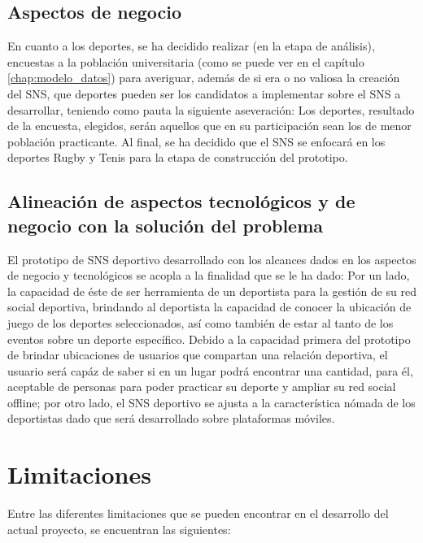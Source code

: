 \subsection{Aspectos de negocio}

En cuanto a los deportes, se ha decidido realizar (en la etapa de análisis), encuestas a la población universitaria (como se puede ver en el capítulo \ref{chap:modelo_datos}) para averiguar, además de si era o no valiosa la creación del SNS, que deportes pueden ser los candidatos a implementar sobre el SNS a desarrollar, teniendo como pauta la siguiente aseveración: Los deportes, resultado de la encuesta, elegidos, serán aquellos que en su participación sean los de menor población practicante. Al final, se ha decidido que el SNS se enfocará en los deportes Rugby y Tenis para la etapa de construcción del prototipo.

\subsection{Alineación de aspectos tecnológicos y de negocio con la solución del problema}

El prototipo de SNS deportivo desarrollado con los alcances dados en los aspectos de negocio y tecnológicos se acopla a la finalidad que se le ha dado: Por un lado, la capacidad de éste de ser herramienta de un deportista para la gestión de su red social deportiva, brindando al deportista la capacidad de conocer la ubicación de juego de los deportes seleccionados, así como también de estar al tanto de los eventos sobre un deporte específico. Debido a la capacidad primera del prototipo de brindar ubicaciones de usuarios que compartan una relación deportiva, el usuario será capáz de saber si en un lugar podrá encontrar una cantidad, para él, aceptable de personas para poder practicar su deporte y ampliar su red social offline; por otro lado, el SNS deportivo se ajusta a la característica nómada de los deportistas dado que será desarrollado sobre plataformas móviles.

\section{Limitaciones}

Entre las diferentes limitaciones que se pueden encontrar en el desarrollo del actual proyecto, se encuentran las siguientes:

